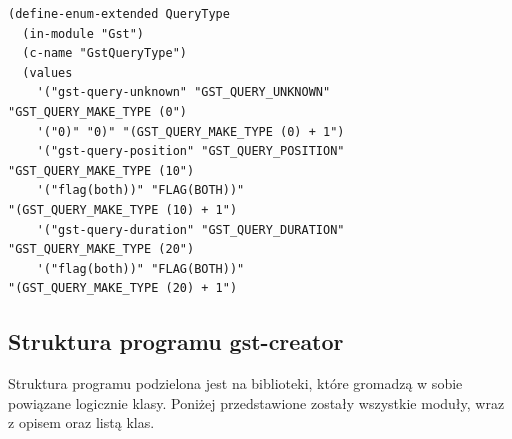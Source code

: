 \documentclass[12pt]{article}
\begin{document}
    \begin{lstlisting}[caption=Błędnie wygenerowany kod przez generator, label=outputGeneratedEnum]
(define-enum-extended QueryType
  (in-module "Gst")
  (c-name "GstQueryType")
  (values
    '("gst-query-unknown" "GST_QUERY_UNKNOWN" 
"GST_QUERY_MAKE_TYPE (0")
    '("0)" "0)" "(GST_QUERY_MAKE_TYPE (0) + 1")
    '("gst-query-position" "GST_QUERY_POSITION" 
"GST_QUERY_MAKE_TYPE (10")
    '("flag(both))" "FLAG(BOTH))" 
"(GST_QUERY_MAKE_TYPE (10) + 1")
    '("gst-query-duration" "GST_QUERY_DURATION" 
"GST_QUERY_MAKE_TYPE (20")
    '("flag(both))" "FLAG(BOTH))" 
"(GST_QUERY_MAKE_TYPE (20) + 1")
    \end{lstlisting}

\subsection{Struktura programu gst-creator}
Struktura programu podzielona jest na biblioteki, które gromadzą w sobie powiązane logicznie klasy. Poniżej przedstawione zostały wszystkie moduły, wraz z opisem oraz listą klas.
\end{document}
